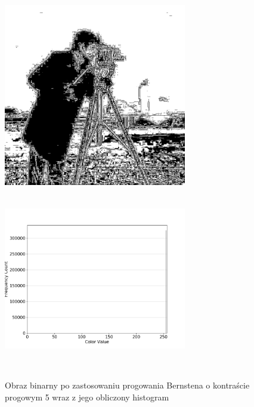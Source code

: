 \documentclass[a4paper,12pt]{book}
\begin{document}
\begin{figure}[H]
	\caption{Obraz binarny po zastosowaniu progowania Bernstena o kontraście progowym 5 wraz z jego obliczony histogram}
	\includegraphics[width=8cm, height=8cm]{5-4/local-threshold-image-photoman-5.png}
	\includegraphics[width=8cm, height=8cm]{5-4/local-threshold-photoman-5.png}
	

\end{figure}
\end{document}

